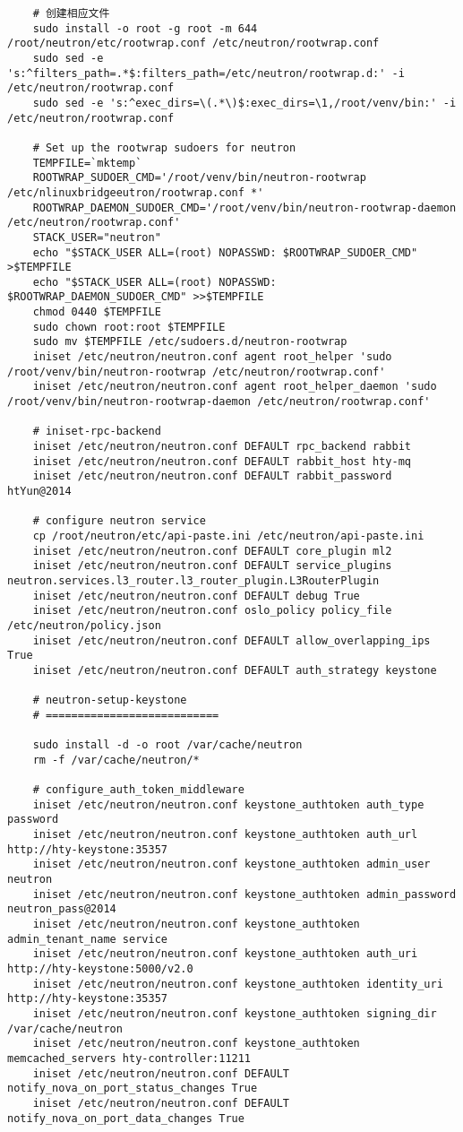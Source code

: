 \documentclass[a4paper,left=1.5cm,right=1.5cm,11pt]{article}
\begin{document}
\begin{lstlisting}
	# 创建相应文件
	sudo install -o root -g root -m 644 /root/neutron/etc/rootwrap.conf /etc/neutron/rootwrap.conf
	sudo sed -e 's:^filters_path=.*$:filters_path=/etc/neutron/rootwrap.d:' -i /etc/neutron/rootwrap.conf
	sudo sed -e 's:^exec_dirs=\(.*\)$:exec_dirs=\1,/root/venv/bin:' -i /etc/neutron/rootwrap.conf

	# Set up the rootwrap sudoers for neutron
	TEMPFILE=`mktemp`
	ROOTWRAP_SUDOER_CMD='/root/venv/bin/neutron-rootwrap /etc/nlinuxbridgeeutron/rootwrap.conf *'
	ROOTWRAP_DAEMON_SUDOER_CMD='/root/venv/bin/neutron-rootwrap-daemon /etc/neutron/rootwrap.conf'
	STACK_USER="neutron"
	echo "$STACK_USER ALL=(root) NOPASSWD: $ROOTWRAP_SUDOER_CMD" >$TEMPFILE
    echo "$STACK_USER ALL=(root) NOPASSWD: $ROOTWRAP_DAEMON_SUDOER_CMD" >>$TEMPFILE
    chmod 0440 $TEMPFILE
    sudo chown root:root $TEMPFILE
    sudo mv $TEMPFILE /etc/sudoers.d/neutron-rootwrap
	iniset /etc/neutron/neutron.conf agent root_helper 'sudo /root/venv/bin/neutron-rootwrap /etc/neutron/rootwrap.conf'
	iniset /etc/neutron/neutron.conf agent root_helper_daemon 'sudo /root/venv/bin/neutron-rootwrap-daemon /etc/neutron/rootwrap.conf'

	# iniset-rpc-backend
	iniset /etc/neutron/neutron.conf DEFAULT rpc_backend rabbit
	iniset /etc/neutron/neutron.conf DEFAULT rabbit_host hty-mq
	iniset /etc/neutron/neutron.conf DEFAULT rabbit_password htYun@2014

	# configure neutron service
	cp /root/neutron/etc/api-paste.ini /etc/neutron/api-paste.ini
	iniset /etc/neutron/neutron.conf DEFAULT core_plugin ml2
	iniset /etc/neutron/neutron.conf DEFAULT service_plugins neutron.services.l3_router.l3_router_plugin.L3RouterPlugin
	iniset /etc/neutron/neutron.conf DEFAULT debug True
	iniset /etc/neutron/neutron.conf oslo_policy policy_file /etc/neutron/policy.json
	iniset /etc/neutron/neutron.conf DEFAULT allow_overlapping_ips True
	iniset /etc/neutron/neutron.conf DEFAULT auth_strategy keystone

	# neutron-setup-keystone
	# ===========================

	sudo install -d -o root /var/cache/neutron
	rm -f /var/cache/neutron/*

	# configure_auth_token_middleware
	iniset /etc/neutron/neutron.conf keystone_authtoken auth_type password
	iniset /etc/neutron/neutron.conf keystone_authtoken auth_url http://hty-keystone:35357
	iniset /etc/neutron/neutron.conf keystone_authtoken admin_user neutron
	iniset /etc/neutron/neutron.conf keystone_authtoken admin_password neutron_pass@2014
	iniset /etc/neutron/neutron.conf keystone_authtoken admin_tenant_name service
	iniset /etc/neutron/neutron.conf keystone_authtoken auth_uri http://hty-keystone:5000/v2.0
	iniset /etc/neutron/neutron.conf keystone_authtoken identity_uri http://hty-keystone:35357
	iniset /etc/neutron/neutron.conf keystone_authtoken signing_dir /var/cache/neutron
	iniset /etc/neutron/neutron.conf keystone_authtoken memcached_servers hty-controller:11211
	iniset /etc/neutron/neutron.conf DEFAULT notify_nova_on_port_status_changes True
	iniset /etc/neutron/neutron.conf DEFAULT notify_nova_on_port_data_changes True


\end{lstlisting}
\end{document}

